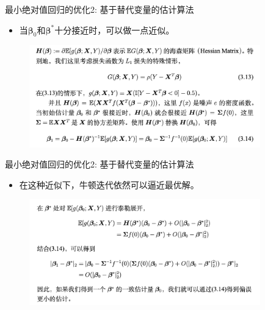 \begin{frame}{最小绝对值回归的优化2: 基于替代变量的估计算法}
    \begin{itemize}
        \item 当$\bm \beta_0$和$\bm \beta^*$十分接近时，可以做一点近似。
    \end{itemize}
\begin{figure}[H]
\includegraphics[width=10cm]{pics/step2.png}
\end{figure}
\end{frame}

\begin{frame}{最小绝对值回归的优化2: 基于替代变量的估计算法}
    \begin{itemize}
        \item 在这种近似下，牛顿迭代依然可以逼近最优解。
    \end{itemize}
\begin{figure}[H]
\includegraphics[width=10cm]{pics/step3.png}
\end{figure}
\end{frame}

